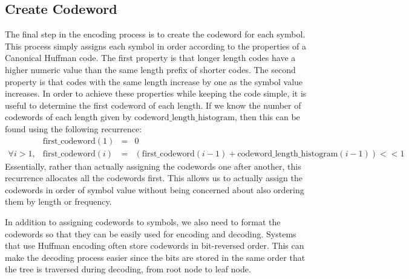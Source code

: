 \subsection{Create Codeword}
\label{sec:create_codewords}

The final step in the encoding process is to create the codeword for each symbol.  This process simply assigns each symbol in order according to the properties of a Canonical Huffman code.  The first property is that longer length codes have a higher numeric value than the same length prefix of shorter codes.  The second property is that codes with the same length increase by one as the symbol value increases.  In order to achieve these properties while keeping the code simple, it is useful to determine the first codeword of each length.  If we know the number of codewords of each length given by $\mathrm{codeword\_length\_histogram}$, then this can be found using the following recurrence:
\begin{equation}
\begin{array} {rrcl}
&\mathrm{first\_codeword}(1) &=& 0 \\
\forall i > 1, &\mathrm{first\_codeword}(i) &=& (\mathrm{first\_codeword}(i-1) + \mathrm{codeword\_length\_histogram}(i-1)) << 1
\label{eq:first_codeword_recurrence}
\end{array}
\end{equation}  
Essentially, rather than actually assigning the codewords one after another, this recurrence allocates all the codewords first.  This allows us to actually assign the codewords in order of symbol value without being concerned about also ordering them by length or frequency.

In addition to assigning codewords to symbols, we also need to format the codewords so that they can be easily used for encoding and decoding.  Systems that use Huffman encoding often store codewords in bit-reversed order. This can make the decoding process easier since the bits are stored in the same order that the tree is traversed during decoding, from root node to leaf node. 

